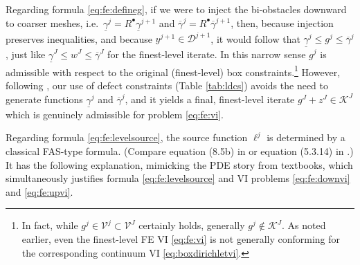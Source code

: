 \documentclass[letterpaper,final,12pt,reqno]{amsart}
\theoremstyle{cstyle}
\theoremstyle{cstyle*}
\theoremstyle{dstyle}
\numberwithin{equation}{section}
\numberwithin{figure}{section}
\numberwithin{table}{section}
\numberwithin{theorem}{section}
\newcommand{\cK}{\mathcal{K}}
\newcommand{\cV}{\mathcal{V}}
\newcommand{\iR}{R^{\bullet}}
\begin{document}
Regarding formula \eqref{eq:fe:defineg}, if we were to inject the bi-obstacles downward to coarser meshes, i.e.~$\underline{\gamma}^j = \iR \underline{\gamma}^{j+1}$ and $\overline{\gamma}^j = \iR \overline{\gamma}^{j+1}$, then, because injection preserves inequalities, and because $y^{j+1} \in \mathcal{D}^{j+1}$, it would follow that $\underline{\gamma}^j \le g^j \le \overline{\gamma}^j$, just like $\underline{\gamma}^J \le w^J \le \overline{\gamma}^J$ for the finest-level iterate.  In this narrow sense $g^j$ is admissible with respect to the original (finest-level) box constraints.\footnote{In fact, while $g^j \in \cV^j \subset \cV^J$ certainly holds, generally $g^j \notin \cK^J$.  As noted earlier, even the finest-level FE VI \eqref{eq:fe:vi} is not generally conforming for the corresponding continuum VI \eqref{eq:boxdirichletvi}.}  However, following \cite{GraeserKornhuber2009}, our use of defect constraints (Table \ref{tab:ldcs}) avoids the need to generate functions $\underline{\gamma}^j$ and $\overline{\gamma}^j$, and it yields a final, finest-level iterate $g^J+z^J \in \cK^J$ which is genuinely admissible for problem \eqref{eq:fe:vi}.

Regarding formula \eqref{eq:fe:levelsource}, the source function $\ell^j$ is determined by a classical FAS-type formula.  (Compare equation (8.5b) in \cite{BrandtLivne2011} or equation (5.3.14) in \cite{Trottenbergetal2001}.)  It has the following explanation, mimicking the PDE story from textbooks, which simultaneously justifies formula \eqref{eq:fe:levelsource} and VI problems \eqref{eq:fe:downvi} and \eqref{eq:fe:upvi}.
\end{document}
